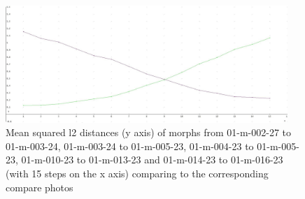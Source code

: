 \begin{figure}[htbp] 
	\centering
		\includegraphics[width=0.95\textwidth]{Resources/result1-5-mean.jpg}
	\caption{Mean squared l2 distances (y axis) of morphs from 01-m-002-27 to 01-m-003-24, 01-m-003-24 to 01-m-005-23, 01-m-004-23 to 01-m-005-23, 01-m-010-23 to 01-m-013-23 and 01-m-014-23 to 01-m-016-23 (with 15 steps on the x axis) comparing to the corresponding compare photos}
	\label{fig:Result1-5-mean}
\end{figure}
\newpage
